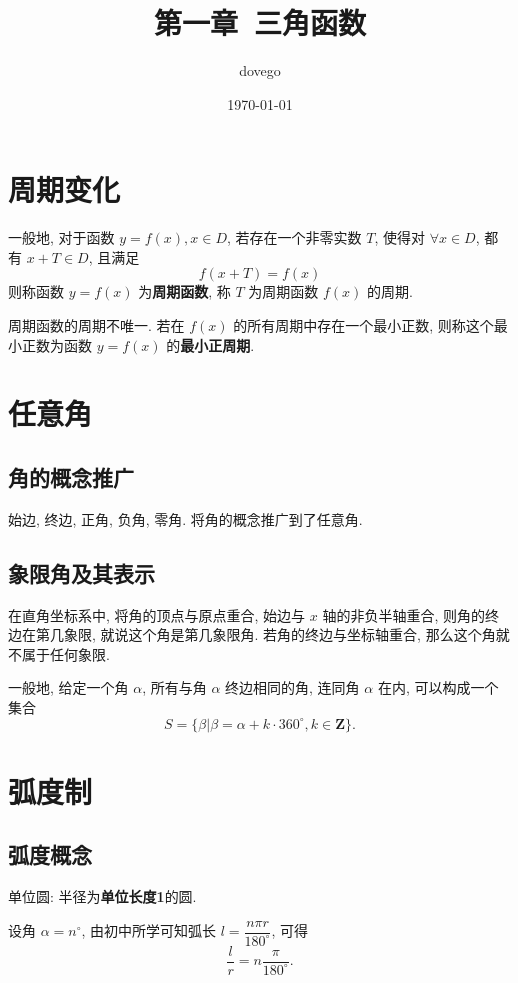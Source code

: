\documentclass[titlepage]{ctexart}
\title{第一章~三角函数}
\author{dovego}
\date{\today}
\begin{document}
\maketitle


\section{周期变化}

一般地, 对于函数 $y = f(x), x \in D$, 若存在一个非零实数 $T$, 使得对 $\forall x \in D$, 都有 $x + T \in D$, 且满足
\[
f(x + T) = f(x)
\]
则称函数 $y = f(x)$ 为\textbf{周期函数}, 称 $T$ 为周期函数 $f(x)$ 的周期. 

周期函数的周期不唯一. 若在 $f(x)$ 的所有周期中存在一个最小正数, 则称这个最小正数为函数 $y = f(x)$ 的\textbf{最小正周期}. 


\section{任意角}

\subsection{角的概念推广}

始边, 终边, 正角, 负角, 零角. 将角的概念推广到了任意角.

\subsection{象限角及其表示}

在直角坐标系中, 将角的顶点与原点重合, 始边与 $x$ 轴的非负半轴重合, 则角的终边在第几象限, 就说这个角是第几象限角.
若角的终边与坐标轴重合, 那么这个角就不属于任何象限.

一般地, 给定一个角 $\alpha$, 所有与角 $\alpha$ 终边相同的角, 连同角 $\alpha$ 在内, 可以构成一个集合
\[
S = \{\beta | \beta = \alpha + k \cdot 360^\circ, k\in \mathbf{Z}\}.
\]


\section{弧度制}

\subsection{弧度概念}

单位圆: 半径为\textbf{单位长度1}的圆.

设角 $\alpha = n^\circ$, 由初中所学可知弧长 $l = \dfrac{n\pi r}{180^\circ}$, 可得
\[
\frac{l}{r} = n\frac{\pi}{180^\circ}.
\]
\end{document}
